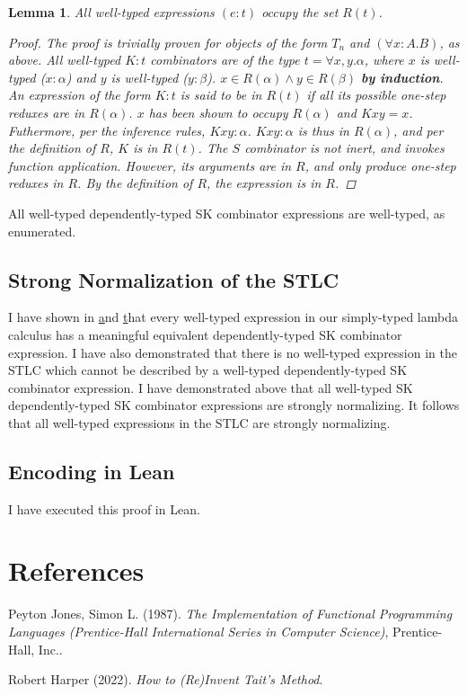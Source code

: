 \documentclass[11pt]{article}
\newtheorem{lemma}[theorem]{Lemma}
\begin{document}
\begin{enumerate}
\begin{lemma}
All well-typed expressions $(e : t)$ occupy the set $R(t)$.
\begin{proof}
The proof is trivially proven for objects of the form $T_{n}$ and $(\forall x:A.B)$, as above.
All well-typed $K : t$ combinators are of the type $t = \forall x, y.\alpha$, where $x$ is well-typed ($x : \alpha$) and $y$ is well-typed ($y : \beta$).
$x \in R(\alpha) \land y \in R(\beta)$ \textbf{by induction}.
An expression of the form $K : t$ is said to be in $R(t)$ if all its possible one-step reduxes are in $R(\alpha)$.
$x$ has been shown to occupy $R(\alpha)$ and $K x y = x$. Futhermore, per the inference rules, $K x y : \alpha$. $K x y : \alpha$ is thus in $R(\alpha)$,
and per the definition of $R$, $K$ is in $R(t)$. The $S$ combinator is not inert, and invokes function application. However, its arguments are in $R$, and only produce one-step reduxes in $R$. By the definition of $R$, the expression is in $R$.
\end{proof}
\end{lemma}

All well-typed dependently-typed SK combinator expressions are well-typed, as enumerated.
\end{enumerate}
\subsection{Strong Normalization of the STLC}
\label{sec:orge2bab0f}

I have shown in \href{decomplemma:1} and \href{maplemma:1} that every well-typed expression in our simply-typed lambda calculus has a meaningful equivalent dependently-typed SK combinator expression.
I have also demonstrated that there is no well-typed expression in the STLC which cannot be described by a well-typed dependently-typed SK combinator expression.
I have demonstrated above that all well-typed SK dependently-typed SK combinator expressions are strongly normalizing. It follows that all well-typed expressions in the STLC are strongly normalizing.
\subsection{Encoding in Lean}
\label{sec:org9cf67b1}

I have executed this proof in Lean.
\section{References}
\label{sec:org2d67058}

\noindent
Peyton Jones, Simon L. (1987). \emph{The Implementation of Functional Programming Languages (Prentice-Hall International Series in Computer Science)}, Prentice-Hall, Inc..

\noindent
Robert Harper (2022). \emph{How to (Re)Invent Tait’s Method}.
\end{document}
